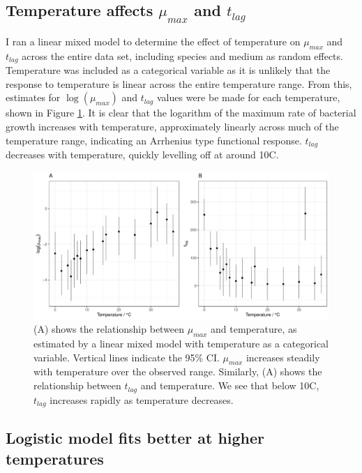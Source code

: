 \documentclass[11pt, a4paper]{article}
\begin{document}
\begin{linenumbers}
        \subsection{Temperature affects $\mu_{max}$ and $t_{lag}$}
        
         I ran a linear mixed model to determine the effect of temperature on $\mu_{max}$ and $t_{lag}$ across the entire data set, including species and medium as random effects. Temperature was included as a categorical variable as it is unlikely that the response to temperature is linear across the entire temperature range. From this, estimates for $\log(\mu_{max})$ and $t_{lag}$ values were be made for each temperature, shown in Figure \ref{fig:params_temp}. It is clear that the logarithm of the maximum rate of bacterial growth increases with temperature, approximately linearly across much of the temperature range, indicating an Arrhenius type functional response. $t_{lag}$ decreases with temperature, quickly levelling off at around 10\degree C. 

                \begin{figure}[H]
        \includegraphics[width=\linewidth]{../results/tlags.pdf}
        \caption{(A) shows the relationship between $\mu_{max}$ and temperature, as estimated by a linear mixed model with temperature as a categorical variable. Vertical lines indicate the 95\% CI. $\mu_{max}$ increases steadily with temperature over the observed range. Similarly, (A) shows the relationship between $t_{lag}$ and temperature. We see that below 10\degree C, $t_{lag}$ increases rapidly as temperature decreases.   }
        \label{fig:params_temp}
        \end{figure}  



\subsection{Logistic model fits better at higher temperatures}


\end{linenumbers}
\end{document}
